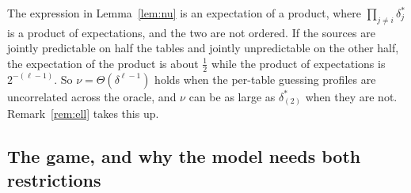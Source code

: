 \documentclass{conjura-conjecture}
\begin{document}
\begin{remark}
\label{rem:notproduct}
The expression in Lemma~\ref{lem:nu} is an expectation of a product, where
$\prod_{j \ne i}\delta^{\ast}_j$ is a product of expectations, and the two
are not ordered. If the sources are jointly predictable on half the tables
and jointly unpredictable on the other half, the expectation of the
product is about $\tfrac12$ while the product of expectations is
$2^{-(\ell-1)}$. So $\nu = \Theta(\delta^{\ell-1})$ holds when the
per-table guessing profiles are uncorrelated across the oracle, and $\nu$
can be as large as $\delta^{\ast}_{(2)}$ when they are not.
Remark~\ref{rem:ell} takes this up.
\end{remark}

\subsection{The game, and why the model needs both restrictions}
\label{sec:game}
\end{document}
